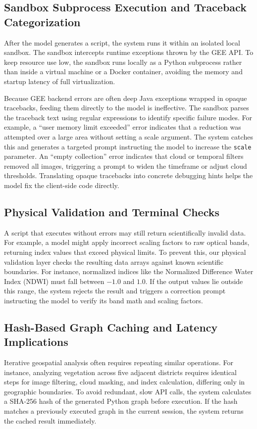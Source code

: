 \documentclass[pdflatex,sn-mathphys-ay]{sn-jnl}
\begin{document}
\subsection{Sandbox Subprocess Execution and Traceback Categorization}\label{sec:arch_sandbox}
After the model generates a script, the system runs it within an isolated local sandbox. The sandbox intercepts runtime exceptions thrown by the GEE API. To keep resource use low, the sandbox runs locally as a Python subprocess rather than inside a virtual machine or a Docker container, avoiding the memory and startup latency of full virtualization.

Because GEE backend errors are often deep Java exceptions wrapped in opaque tracebacks, feeding them directly to the model is ineffective. The sandbox parses the traceback text using regular expressions to identify specific failure modes. For example, a ``user memory limit exceeded'' error indicates that a reduction was attempted over a large area without setting a scale argument. The system catches this and generates a targeted prompt instructing the model to increase the \texttt{scale} parameter. An ``empty collection'' error indicates that cloud or temporal filters removed all images, triggering a prompt to widen the timeframe or adjust cloud thresholds. Translating opaque tracebacks into concrete debugging hints helps the model fix the client-side code directly.

\subsection{Physical Validation and Terminal Checks}\label{sec:arch_physics}
A script that executes without errors may still return scientifically invalid data. For example, a model might apply incorrect scaling factors to raw optical bands, returning index values that exceed physical limits. To prevent this, our physical validation layer checks the resulting data arrays against known scientific boundaries. For instance, normalized indices like the Normalized Difference Water Index (NDWI) must fall between $-1.0$ and $1.0$. If the output values lie outside this range, the system rejects the result and triggers a correction prompt instructing the model to verify its band math and scaling factors.

\subsection{Hash-Based Graph Caching and Latency Implications}\label{sec:arch_caching}
Iterative geospatial analysis often requires repeating similar operations. For instance, analyzing vegetation across five adjacent districts requires identical steps for image filtering, cloud masking, and index calculation, differing only in geographic boundaries. To avoid redundant, slow API calls, the system calculates a SHA-256 hash of the generated Python graph before execution. If the hash matches a previously executed graph in the current session, the system returns the cached result immediately.
\end{document}
